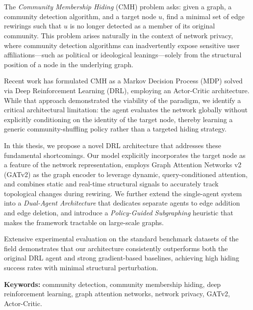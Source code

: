\chapter*{\runtitle}

\noindent
The \emph{Community Membership Hiding} (CMH) problem asks: given a graph, a community
detection algorithm, and a target node $u$, find a minimal set of edge rewirings such
that $u$ is no longer detected as a member of its original community. This problem arises
naturally in the context of network privacy, where community detection algorithms can
inadvertently expose sensitive user affiliations---such as political or ideological
leanings---solely from the structural position of a node in the underlying graph.

Recent work has formulated CMH as a Markov Decision Process (MDP) solved via Deep
Reinforcement Learning (DRL), employing an Actor-Critic architecture. While that
approach demonstrated the viability of the paradigm, we identify a critical architectural
limitation: the agent evaluates the network globally without explicitly conditioning on
the identity of the target node, thereby learning a generic community-shuffling policy
rather than a targeted hiding strategy.

In this thesis, we propose a novel DRL architecture that addresses these fundamental
shortcomings. Our model explicitly incorporates the target node as a feature of the
network representation, employs Graph Attention Networks v2 (GATv2) as the graph
encoder to leverage dynamic, query-conditioned attention, and combines static and
real-time structural signals to accurately track topological changes during rewiring.
We further extend the single-agent system into a \emph{Dual-Agent Architecture} that
dedicates separate agents to edge addition and edge deletion, and introduce a
\emph{Policy-Guided Subgraphing} heuristic that makes the framework tractable on
large-scale graphs.

Extensive experimental evaluation on the standard benchmark datasets of the field
demonstrates that our architecture consistently outperforms both the original DRL
agent and strong gradient-based baselines, achieving high hiding success rates with
minimal structural perturbation.

\bigskip

\noindent\textbf{Keywords:} community detection, community membership hiding, deep
reinforcement learning, graph attention networks, network privacy, GATv2, Actor-Critic.
